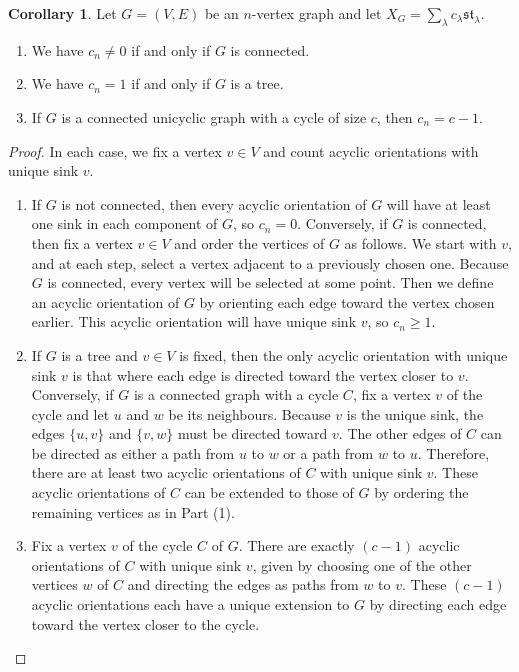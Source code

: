 \documentclass[12pt]{amsart}  %
\theoremstyle{definition}
\newtheorem{corollary}[theorem]{Corollary}
\theoremstyle{remark}
\numberwithin{equation}{section}
\begin{document}
\begin{corollary} \label{cor:coefn} Let $G=(V,E)$ be an $n$-vertex graph and let $X_G=\sum_\lambda c_\lambda\mathfrak{st}_\lambda$. 
\begin{enumerate}
\item We have $c_n\neq 0$ if and only if $G$ is connected.
\item \cite[Section 3]{chromstar} We have $c_n=1$ if and only if $G$ is a tree.
\item \cite[Corollary 3.4]{chromunicyclic} If $G$ is a connected unicyclic graph with a cycle of size $c$, then $c_n=c-1$. 
\end{enumerate}
\end{corollary}

\begin{proof} In each case, we fix a vertex $v\in V$ and count acyclic orientations with unique sink $v$. 
\begin{enumerate}
\item If $G$ is not connected, then every acyclic orientation of $G$ will have at least one sink in each component of $G$, so $c_n=0$. Conversely, if $G$ is connected, then fix a vertex $v\in V$ and order the vertices of $G$ as follows. We start with $v$, and at each step, select a vertex adjacent to a previously chosen one. Because $G$ is connected, every vertex will be selected at some point. Then we define an acyclic orientation of $G$ by orienting each edge toward the vertex chosen earlier. This acyclic orientation will have unique sink $v$, so $c_n\geq 1$.
\item If $G$ is a tree and $v\in V$ is fixed, then the only acyclic orientation with unique sink $v$ is that where each edge is directed toward the vertex closer to $v$. Conversely, if $G$ is a connected graph with a cycle $C$, fix a vertex $v$ of the cycle and let $u$ and $w$ be its neighbours. Because $v$ is the unique sink, the edges $\{u,v\}$ and $\{v,w\}$ must be directed toward $v$. The other edges of $C$ can be directed as either a path from $u$ to $w$ or a path from $w$ to $u$. Therefore, there are at least two acyclic orientations of $C$ with unique sink $v$. These acyclic orientations of $C$ can be extended to those of $G$ by ordering the remaining vertices as in Part (1).
\item Fix a vertex $v$ of the cycle $C$ of $G$. There are exactly $(c-1)$ acyclic orientations of $C$ with unique sink $v$, given by choosing one of the other vertices $w$ of $C$ and directing the edges as paths from $w$ to $v$. These $(c-1)$ acyclic orientations each have a unique extension to $G$ by directing each edge toward the vertex closer to the cycle.
\end{enumerate}
\end{proof}
\end{document}
